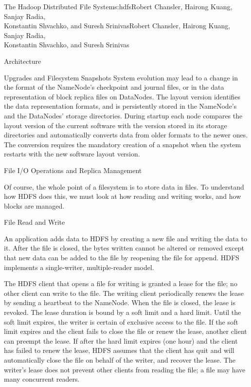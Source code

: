 \begin{aosachaptertoc}{The Hadoop Distributed File System}{s:hdfs}{Robert Chansler, Hairong Kuang, Sanjay Radia, \\ Konstantin Shvachko, and Suresh Srinivas}{Robert Chansler, Hairong Kuang, Sanjay Radia, \\ \hspace*{0.9cm} Konstantin Shvachko, and Suresh Srinivas}
\begin{aosasect1}{Architecture}
\begin{aosasect2}{Upgrades and Filesystem Snapshots}
System evolution may lead to a change in the format of the NameNode's
checkpoint and journal files, or in the data representation of block
replica files on DataNodes. The layout version identifies the data
representation formats, and is persistently stored in the NameNode's
and the DataNodes' storage directories. During startup each node
compares the layout version of the current software with the version
stored in its storage directories and automatically converts data from
older formats to the newer ones. The conversion requires the mandatory
creation of a snapshot when the system restarts with the new software
layout version.

\end{aosasect2}

\end{aosasect1}

\begin{aosasect1}{File I/O Operations and Replica Management}

Of course, the whole point of a filesystem is to store data in
files.  To understand how HDFS does this, we must look at how reading
and writing works, and how blocks are managed.

\begin{aosasect2}{File Read and Write}

An application adds data to HDFS by creating a new file and writing
the data to it. After the file is closed, the bytes written cannot be
altered or removed except that new data can be added to the file by
reopening the file for append. HDFS implements a single-writer,
multiple-reader model.

The HDFS client that opens a file for writing is granted a lease for
the file; no other client can write to the file.  The writing client
periodically renews the lease by sending a heartbeat to the
NameNode. When the file is closed, the lease is revoked. The lease
duration is bound by a soft limit and a hard limit. Until the soft
limit expires, the writer is certain of exclusive access to the
file. If the soft limit expires and the client fails to close the file
or renew the lease, another client can preempt the lease. If after the
hard limit expires (one hour) and the client has failed to renew the
lease, HDFS assumes that the client has quit and will automatically
close the file on behalf of the writer, and recover the lease. The
writer's lease does not prevent other clients from reading the file; a
file may have many concurrent readers.


\end{aosasect2}
\end{aosasect1}
\end{aosachaptertoc}
